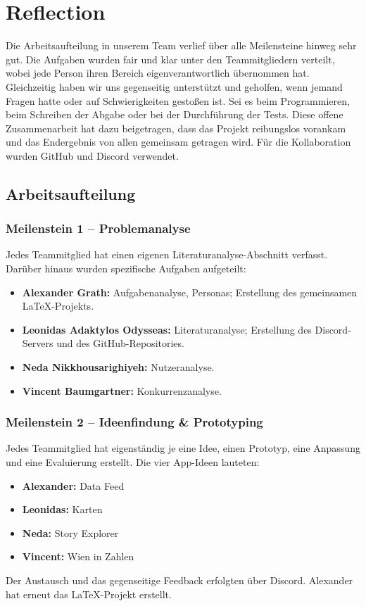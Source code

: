 \section{Reflection}

Die Arbeitsaufteilung in unserem Team verlief über alle Meilensteine hinweg sehr gut.
Die Aufgaben wurden fair und klar unter den Teammitgliedern verteilt, wobei jede Person ihren Bereich eigenverantwortlich übernommen hat.
Gleichzeitig haben wir uns gegenseitig unterstützt und geholfen, wenn jemand Fragen hatte oder auf Schwierigkeiten gestoßen ist. Sei es beim Programmieren, beim Schreiben der Abgabe oder bei der Durchführung der Tests.
Diese offene Zusammenarbeit hat dazu beigetragen, dass das Projekt reibungslos vorankam und das Endergebnis von allen gemeinsam getragen wird.
Für die Kollaboration wurden GitHub und Discord verwendet.

\subsection{Arbeitsaufteilung}

\subsubsection*{Meilenstein 1 – Problemanalyse}

Jedes Teammitglied hat einen eigenen Literaturanalyse-Abschnitt verfasst.
Darüber hinaus wurden spezifische Aufgaben aufgeteilt:
\begin{itemize}
    \item \textbf{Alexander Grath:} Aufgabenanalyse, Personas; Erstellung des gemeinsamen \LaTeX-Projekts.
    \item \textbf{Leonidas Adaktylos Odysseas:} Literaturanalyse; Erstellung des Discord-Servers und des GitHub-Repositories.
    \item \textbf{Neda Nikkhousarighiyeh:} Nutzeranalyse.
    \item \textbf{Vincent Baumgartner:} Konkurrenzanalyse.
\end{itemize}

\subsubsection*{Meilenstein 2 – Ideenfindung \& Prototyping}

Jedes Teammitglied hat eigenständig je eine Idee, einen Prototyp, eine Anpassung und eine Evaluierung erstellt.
Die vier App-Ideen lauteten:
\begin{itemize}
    \item \textbf{Alexander:} Data Feed
    \item \textbf{Leonidas:} Karten
    \item \textbf{Neda:} Story Explorer
    \item \textbf{Vincent:} Wien in Zahlen
\end{itemize}
Der Austausch und das gegenseitige Feedback erfolgten über Discord.
Alexander hat erneut das \LaTeX-Projekt erstellt.

